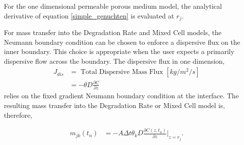 For the one dimensional permeable porous medium model, the analytical 
derivative of equation \eqref{simple_genuchten} is evaluated at $r_j$.


For mass transfer into the Degradation Rate and Mixed Cell models, the Neumann 
boundary condition can be chosen to enforce a dispersive flux on the inner 
boundary. This choice is appropriate when the user expects a primarily 
dispersive flow across the boundary. The dispersive flux in one dimension, 
\begin{align}
      J_{dis} &= \mbox{ Total Dispersive Mass Flux }[kg/m^2/s]\nonumber\\
      &= -\theta D\frac{\partial C}{\partial z} \nonumber
\end{align}
relies on the fixed gradient Neumann boundary condition at the interface. 
The resulting mass transfer into the Degradation Rate or Mixed Cell model is, 
therefore, 

\begin{align}
m_{jk}(t_n) &= - A\Delta t \theta_k D \frac{\partial C(z,t_n)}{\partial z}|_{z=r_j}.
\end{align}

